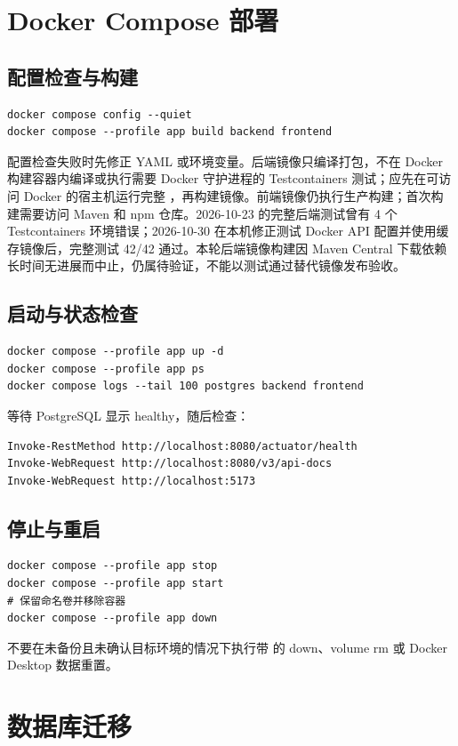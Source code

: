 \documentclass[UTF8,openany,zihao=-4]{ctexrep}
\begin{document}
\chapter{Docker Compose 部署}
\section{配置检查与构建}
\begin{lstlisting}
docker compose config --quiet
docker compose --profile app build backend frontend
\end{lstlisting}
配置检查失败时先修正 YAML 或环境变量。后端镜像只编译打包，不在 Docker 构建容器内编译或执行需要 Docker 守护进程的 Testcontainers 测试；应先在可访问 Docker 的宿主机运行完整 ，再构建镜像。前端镜像仍执行生产构建；首次构建需要访问 Maven 和 npm 仓库。2026-10-23 的完整后端测试曾有 4 个 Testcontainers 环境错误；2026-10-30 在本机修正测试 Docker API 配置并使用缓存镜像后，完整测试 42/42 通过。本轮后端镜像构建因 Maven Central 下载依赖长时间无进展而中止，仍属待验证，不能以测试通过替代镜像发布验收。

\section{启动与状态检查}
\begin{lstlisting}
docker compose --profile app up -d
docker compose --profile app ps
docker compose logs --tail 100 postgres backend frontend
\end{lstlisting}
等待 PostgreSQL 显示 healthy，随后检查：
\begin{lstlisting}
Invoke-RestMethod http://localhost:8080/actuator/health
Invoke-WebRequest http://localhost:8080/v3/api-docs
Invoke-WebRequest http://localhost:5173
\end{lstlisting}

\section{停止与重启}
\enlargethispage{2\baselineskip}
\begin{lstlisting}
docker compose --profile app stop
docker compose --profile app start
# 保留命名卷并移除容器
docker compose --profile app down
\end{lstlisting}
不要在未备份且未确认目标环境的情况下执行带  的 down、volume rm 或 Docker Desktop 数据重置。

\chapter{数据库迁移}
\end{document}
